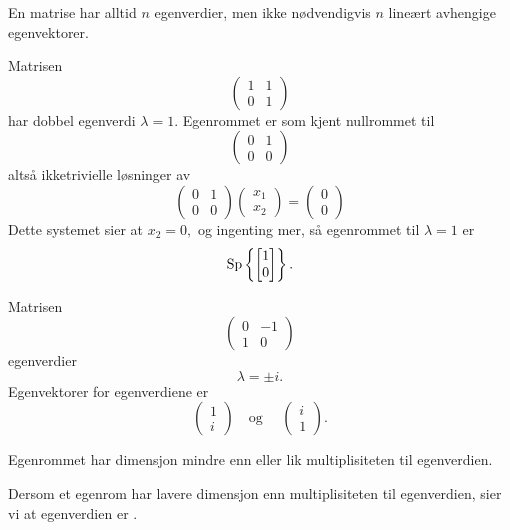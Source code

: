 En matrise har alltid $n$ egenverdier, men ikke nødvendigvis $n$ lineært avhengige egenvektorer.
\begin{ex}
Matrisen
\[
\begin{pmatrix}
1 & 1 \\ 0 &1
\end{pmatrix}
\]
har dobbel egenverdi $\lambda=1$. Egenrommet er som kjent nullrommet til 
\[
\begin{pmatrix}
0 & 1 \\ 0 &0
\end{pmatrix}
\]
altså ikketrivielle løsninger av 
\[
\begin{pmatrix}
0 & 1 \\ 0 &0
\end{pmatrix}
\begin{pmatrix}
x_1  \\ x_2
\end{pmatrix}
=
\begin{pmatrix}
0  \\ 0
\end{pmatrix}
\]
Dette systemet sier at
$
x_2=0,
$
og ingenting mer, så egenrommet til $\lambda=1$ er
\[
\operatorname{Sp} \left\{ \begin{bmatrix} 1 \\ 0 \end{bmatrix} \right\}.
\]
\end{ex}

\begin{ex}
Matrisen
\[
\begin{pmatrix}
0 & -1 \\ 1 &0
\end{pmatrix}
\]
egenverdier
\[
\lambda=\pm i.
\] 
Egenvektorer for egenverdiene er 
\[
\begin{pmatrix}
1  \\ i
\end{pmatrix}
\quad \text{og }\quad
\begin{pmatrix}
i  \\ 1
\end{pmatrix}.
\]
\end{ex}

\begin{thm}
Egenrommet har dimensjon mindre enn eller lik multiplisiteten til egenverdien.
\end{thm}

Dersom et egenrom har lavere dimensjon enn multiplisiteten til egenverdien, sier vi at egenverdien er .


\kapittelslutt
